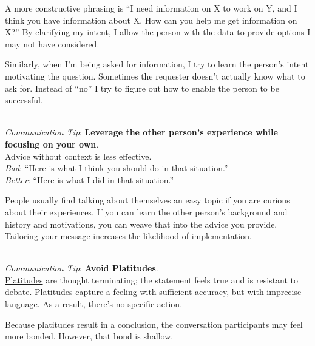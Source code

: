 A more constructive phrasing is ``I need information on X to work on Y, and I think you have information about X. How can you help me get information on X?'' By clarifying my intent, I allow the person with the data to provide options I may not have considered.

Similarly, when I'm being asked for information, I try to learn the person's intent motivating the question. Sometimes the requester doesn't actually know what to ask for. Instead of ``no'' I try to figure out how to enable the person to be successful. 

\ \\
\textit{Communication Tip}: \textbf{Leverage the other person's experience while focusing on your own\label{sec:advice}}.\\
Advice without context is less effective.\\
\textit{Bad}: ``Here is what I think you should do in that situation.''\\
\textit{Better}: ``Here is what I did in that situation.''

People usually find talking about themselves an easy topic if you are curious about their experiences. 
If you can learn the other person's background and history and motivations, you can weave that into the advice you provide. 
Tailoring your message increases the likelihood of implementation. 

\ \\
\textit{Communication Tip}: 
\textbf{Avoid Platitudes\label{sec:platitudes}}.\\
\href{https://en.wikipedia.org/wiki/Platitude}{Platitudes}
are \gls{thought terminating}; 
\marginpar{[Glossary]}
the statement feels true and is resistant to debate. Platitudes capture a feeling with sufficient accuracy, but with imprecise language. As a result, there's no specific action.

Because platitudes result in a conclusion, the conversation participants may feel more bonded. However, that bond is shallow.

